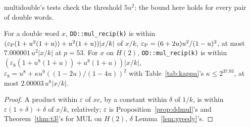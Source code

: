 multidouble's tests check the threshold $5u^2$; the bound here holds for every pair of double words.

\begin{corollary}\label{cor:mulrecip}
For a double word $x$, \texttt{DD::mul\_recip(k)} is within $(\varepsilon_{\rm P}(1 + u^2(1 + u)) + u^2(1 + u))|x/k|$
of $x/k$, $\varepsilon_{\rm P} = (6 + 2u)u^2/(1 - u)^2$, at most $7.000001\,u^2|x/k|$ at $p = 53$. For $x$ on $H(2)$,
\texttt{OD::mul\_recip(k)} is within $(\varepsilon_8(1 + u^8(1 + u)) + u^8(1 + u))|x/k|$, $\varepsilon_8 = u^8 +
\kappa u^9((1 - 2u)/(1 - 4u))^2$ with Table~\ref{tab:kappa}'s $\kappa \le 2^{37.93}$, at most $2.00003\,u^8|x/k|$.
\end{corollary}

\begin{proof}
A product within $\varepsilon$ of $xc$, by a constant within $\delta$ of $1/k$, is within $\varepsilon(1 + \delta) +
\delta$ of $x/k$, relatively; $\varepsilon$ is Proposition~\ref{prop:ddmul}'s and Theorem~\ref{thm:t3}'s for MUL on
$H(2)$, $\delta$ Lemma~\ref{lem:greedy}'s.
\end{proof}
